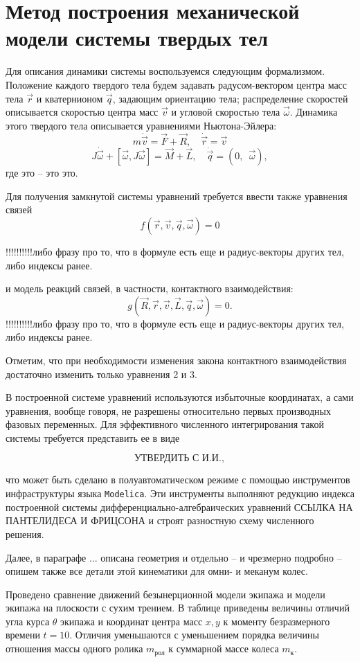 \section{Метод построения механической модели системы твердых тел}

Для описания динамики системы воспользуемся следующим формализмом. Положение каждого твердого тела будем задавать радусом-вектором центра масс тела $\vec{r}$ и кватернионом $\vec{q}$, задающим ориентацию тела; распределение скоростей описывается скоростью центра масс $\vec{v}$ и угловой скоростью тела $\vec{\omega}$.
Динамика этого твердого тела описывается уравнениями Ньютона-Эйлера:
$$ m\dot{\vec{v}} = \vec{F} + \vec{R}, \quad \dot{\vec{r}} = \vec{v} $$
$$ J\dot{\vec{\omega}} + [ \vec{\omega}, J\vec{\omega} ] = \vec{M} + \vec{L}, \quad \dot{\vec{q}} = (0, \enspace \vec{\omega}), $$
где это -- это это.
        
Для получения замкнутой системы уравнений требуется ввести также уравнения связей 
$$ f(\vec{r}, \vec{v}, \vec{q}, \vec{\omega}) = 0 $$

!!!!!!!!!!либо фразу про то, что в формуле есть еще и радиус-векторы других тел, либо индексы ранее.

и модель реакций связей, в частности, контактного взаимодействия:
$$ g(\vec{R}, \vec{r}, \vec{v}, \vec{L}, \vec{q}, \vec{\omega}) = 0. $$
!!!!!!!!!!либо фразу про то, что в формуле есть еще и радиус-векторы других тел, либо индексы ранее.

Отметим, что при необходимости изменения закона контактного взаимодействия достаточно изменить только уравнения 2 и 3.

В построенной системе уравнений используются избыточные координатах, а сами уравнения, вообще говоря, не разрешены относительно первых производных фазовых переменных. Для эффективного численного интегрирования такой системы требуется представить ее в виде

$$ \textit{УТВЕРДИТЬ С И.И.}, $$

что может быть сделано в полуавтоматическом режиме с помощью инструментов инфраструктуры языка \texttt{Modelica}. Эти инструменты выполняют редукцию индекса построенной системы дифференциально-алгебраических уравнений ССЫЛКА НА ПАНТЕЛИДЕСА И ФРИЦСОНА и строят разностную схему  численного решения.

Далее, в параграфе ... описана геометрия и  отдельно -- и чрезмерно подробно -- опишем также все детали этой кинематики для омни- и меканум колес.

Проведено сравнение движений безынерционной модели экипажа и модели экипажа на плоскости с сухим трением.
В таблице приведены величины отличий угла курса $\theta$ экипажа и координат центра масс $x, y$ к моменту безразмерного времени $t = 10$.
Отличия уменьшаются с уменьшением порядка величины отношения массы одного ролика $m_{\text{рол}}$ к суммарной массе колеса $m_{\text{к}}$.

